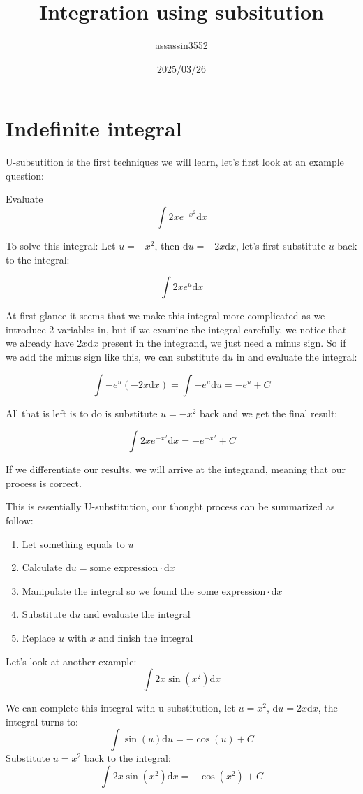 \documentclass{article}
\title{Integration using subsitution}
\author{assassin3552}
\date{2025/03/26}
\numberwithin{equation}{section}
\begin{document}
\maketitle

\section{Indefinite integral}
U-subsutition is the first techniques we will learn, let's first look at an example question:

Evaluate
\[
\int 2x e^{-x^2} \mathrm{d}x
\]

To solve this integral: Let $u = -x^2$, then $\mathrm{d}u = -2x \mathrm{d}x$, let's first substitute $u$ back to the integral:

\[
\int 2x e^u \mathrm{d}x
\]

At first glance it seems that we make this integral more complicated as we introduce 2 variables in,
but if we examine the integral carefully, we notice that we already have $2x\mathrm{d}x$ present in the integrand, we just need a minus sign.
So if we add the minus sign like this, we can substitute $\mathrm{d}u$ in and evaluate the integral:

\[
\int - e^u(-2x \mathrm{d}x) = \int -e^u \mathrm{d}u = -e^u+C
\]

All that is left is to do is substitute $u=-x^2$ back and we get the final result:

\[
\int 2xe^{-x^2} \mathrm{d}x = -e^{-x^2}+C
\]

If we differentiate our results, we will arrive at the integrand, meaning that our process is correct.

This is essentially U-substitution, our thought process can be summarized as follow:
\begin{enumerate}
    \item Let something equals to $u$
    \item Calculate $\mathrm{d}u = \text{some expression} \cdot \mathrm{d}x$
    \item Manipulate the integral so we found the $\text{some expression} \cdot \mathrm{d}x$
    \item Substitute $\mathrm{d}u$ and evaluate the integral
    \item Replace $u$ with $x$ and finish the integral
\end{enumerate}

\newpage
Let's look at another example:
\[
\int 2x \sin(x^2) \mathrm{d}x
\]

We can complete this integral with u-substitution, let $u=x^2$, $\mathrm{d}u = 2x \mathrm{d}x$, the integral turns to:
\[
\int \sin(u)\mathrm{d}u = -\cos(u) + C
\]
Substitute $u = x^2$ back to the integral:
\[
\int 2x \sin(x^2)\mathrm{d}x = -\cos(x^2) + C
\]
\end{document}
